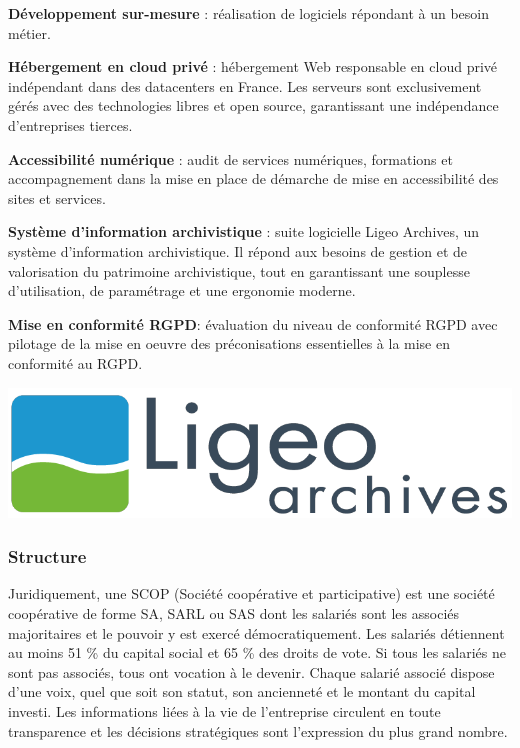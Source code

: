 \documentclass[12pt]{article}
\begin{document}
\noindent%
\begin{minipage}{.7\textwidth}%

\textbf{Développement sur-mesure} : réalisation de logiciels répondant à un besoin métier.

\textbf{Hébergement en cloud privé} : hébergement Web responsable en \gls{cloud privé} indépendant dans des \gls{datacenters} en France. 
Les serveurs sont exclusivement gérés avec des technologies libres et open source, garantissant une indépendance d'entreprises tierces.

\textbf{Accessibilité numérique} : audit de services numériques, formations et accompagnement dans la mise en place de démarche de mise en accessibilité des sites et services.

\textbf{Système d'information archivistique} : suite logicielle Ligeo Archives, un système d'information archivistique. 
Il répond aux besoins de gestion et de valorisation du patrimoine archivistique, tout en garantissant une souplesse d'utilisation, de paramétrage et une ergonomie moderne.

\textbf{Mise en conformité \gls{RGPD}}: évaluation du niveau de conformité \gls{RGPD} avec pilotage de la mise en oeuvre des préconisations essentielles à la mise en conformité au \gls{RGPD}.

\end{minipage}%
\hfill
\begin{minipage}{.3\textwidth}%
\begin{center}
    \includegraphics[scale=0.22]{src/Logo-Ligeo-def_2 (1).png}
\end{center}
\end{minipage}%


\subsubsection{Structure}
\noindent%
\begin{minipage}{.7\textwidth}%
Juridiquement, une SCOP (Société coopérative et participative) est une société coopérative de forme SA, SARL ou SAS dont les salariés sont les associés majoritaires et le pouvoir y est exercé démocratiquement.
Les salariés détiennent au moins 51 \% du capital social et 65 \% des droits de vote. 
Si tous les salariés ne sont pas associés, tous ont vocation à le devenir. 
Chaque salarié associé dispose d’une voix, quel que soit son statut, son ancienneté et le montant du capital investi.
Les informations liées à la vie de l’entreprise circulent en toute transparence et les décisions stratégiques sont l’expression du plus grand nombre.

\end{minipage}%
\hfill
\end{document}
